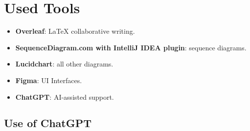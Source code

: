 \section{Used Tools}
\label{sec:used_tools}

\begin{itemize}
    \item \textbf{Overleaf}: LaTeX collaborative writing.
    \item \textbf{SequenceDiagram.com with IntelliJ IDEA plugin}: sequence diagrams.
    \item \textbf{Lucidchart}: all other diagrams.
    \item \textbf{Figma}: UI Interfaces.
    \item \textbf{ChatGPT}: AI-assisted support.
\end{itemize}

\subsection{Use of ChatGPT}
\label{subsec:chatgpt}

